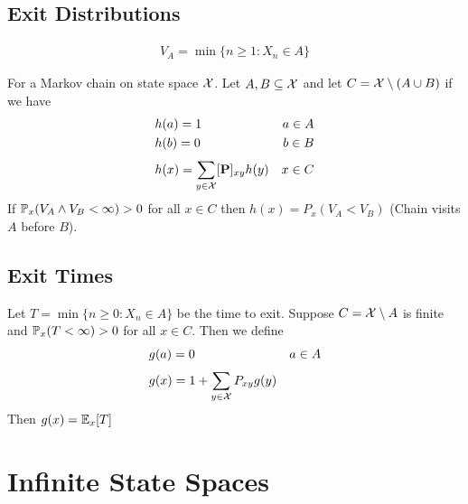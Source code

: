 \documentclass[12pt,a4paper]{article}
\begin{document}
\subsection{Exit Distributions}
\begin{defn}
    \begin{align*}
        V_A = \min \{n\geq 1 : X_n \in A\}
    \end{align*}
\end{defn}
\begin{thm}
    For a Markov chain on state space $\cal X$. Let $A, B \subseteq \cal X$ and let $C = {\cal X}\setminus (A\cup B)$ if we have 
    \begin{align*}
        &h(a) = 1 & a\in A\\
        &h(b) = 0 & b\in B\\
        &h(x) = \nsum{y\in {\cal X}}{}[\vb P]_{xy}h(y) & x\in C
    \end{align*}
    If $\P_x(V_A \wedge V_B < \infty) > 0$ for all $x\in C$ then $h(x) = P_x(V_A < V_B)$ (Chain visits $A$ before $B$). 
\end{thm}

\subsection{Exit Times}
\begin{thm}
    Let $T = \min\{n\geq 0 : X_n \in A\}$ be the time to exit. Suppose $C = {\cal X}\setminus A$ is finite and $\P_x(T < \infty)>0$ for all $x\in C$. Then we define 
    \begin{align*}
        &g(a) = 0 & a\in A\\
        &g(x) = 1 + \nsum{y\in {\cal X}}{}P_{xy}g(y)
    \end{align*}
    Then $g(x) = \E_x[T]$
\end{thm}
\newpage
\section{Infinite State Spaces}
\end{document}
